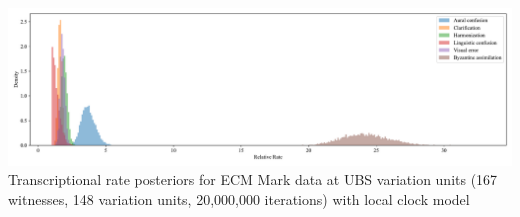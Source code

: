 \documentclass[10pt]{beamer}
\begin{document}
	\begin{frame}
		\begin{center}
			\includegraphics[width=\textwidth]{../img/ecm_mark_local_rates.pdf}\\
			Transcriptional rate posteriors for ECM Mark data at UBS variation units (167 witnesses, 148 variation units, 20,000,000 iterations) with local clock model\\
		\end{center}
	\end{frame}
\end{document}
